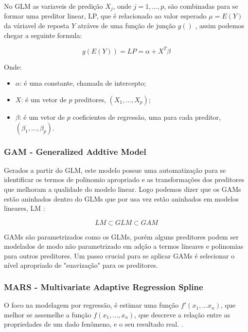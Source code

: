 \documentclass[
	12pt,				%
	openright,			%
	oneside,			%
	a4paper,			%
	english,			%
	brazil				%
	]{abntex2}
\begin{document}
No GLM as variaveis de predição $X_j$, onde $j = 1, ..., p$, são combinadas para se formar uma preditor linear, LP, que
é relacionado ao valor esperado $\mu = E(Y)$ da váriavel de reposta $Y$ atráves de uma função de junção $g()$ 
\cite{GAMeGLM_especie_estudo}, assim podemos chegar a seguinte formula: 

\begin{equation}
	g(E(Y)) = LP = \alpha + X^T \beta
\end{equation}

Onde:
\begin{itemize}
	\item $\alpha$: é uma constante, chamada de intercepto;
	\item $X$: é um vetor de $p$ preditores, $(X_1, ..., X_p)$;
	\item $\beta$: é um vetor de $p$ coeficientes de regressão, uma para cada preditor, $(\beta_1, ..., \beta_p)$.
\end{itemize}

\subsubsection{GAM - Generalized Addtive Model}

Gerados a partir do GLM, este modelo possue uma automatização para se identificar os termos de polinomio apropriado
e as transformações dos preditores que melhoram a qualidade do modelo linear. Logo podemos dizer que os GAMs estão
aninhados dentro do GLMs que por usa vez estão aninhados em modelos lineares, LM \cite{GAMeGLM_especie_estudo}:

\begin{equation}
	LM \subset GLM \subset GAM
\end{equation}

GAMs são parametrizados como os GLMs, porém alguns preditores podem ser modelados de modo não parametrizado em 
adção a termos lineares e polinomias para outros preditores. Um passo crucial para se aplicar GAMs é selecionar
o nível apropriado de "suavização" para os preditores.

\subsubsection{MARS - Multivariate Adaptive Regression Spline}

O foco na modelagem por regressão, é estimar uma função $f'(x_1,...x_n)$, que melhor se assemelhe a função 
$f(x_1,...,x_n)$, que descreve a relação entre as propriedades de um dado fenômeno, e o seu resultado real.
\cite{MARS}. 
\end{document}
